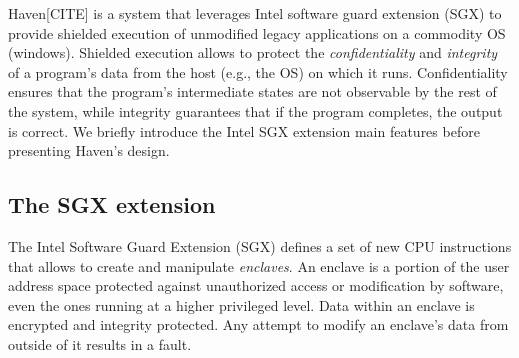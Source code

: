 Haven[CITE] is a system that leverages Intel software guard extension (SGX) to provide shielded execution of unmodified legacy applications on a commodity OS (windows).
Shielded execution allows to protect the \emph{confidentiality} and \emph{integrity} of a program's data from the host (e.g., the OS) on which it runs.
Confidentiality ensures that the program's intermediate states are not observable by the rest of the system, while integrity guarantees that if the program completes, the output is correct.
We briefly introduce the Intel SGX extension main features before presenting Haven's design.



\subsection{The SGX extension}
%
The Intel Software Guard Extension (SGX) defines a set of new CPU instructions that allows to create and manipulate \emph{enclaves}.
An enclave is a portion of the user address space protected against unauthorized access or modification by software, even the ones running at a higher privileged level.
Data within an enclave is encrypted and integrity protected.
Any attempt to modify an enclave's data from outside of it results in a fault.

